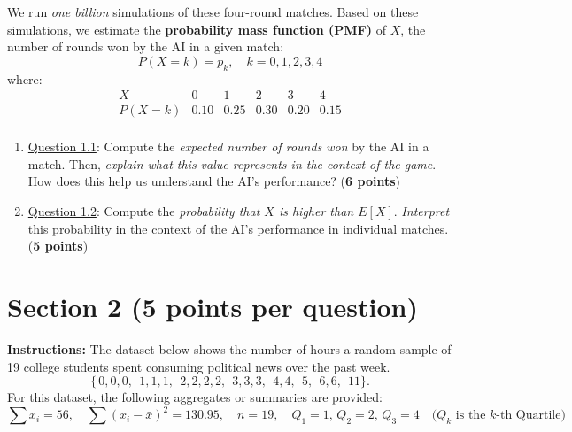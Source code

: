 \documentclass{article}
\newcommand{\blankbox}[2][3cm]{%
    \vspace{-0.5em}
    \begin{figure}[H]
        \makebox[\linewidth]{%
            \begin{tcolorbox}[
                colback=white, 
                colframe=black, 
                width=#2, %
                height=#1,
                boxrule=0.2mm
            ]
            \end{tcolorbox}
        }
    \end{figure}
    \vspace{-2em}
}
\begin{document}
We run \emph{one billion} simulations of these four-round matches. Based on these simulations, we estimate the \textbf{probability mass function (PMF)} of $X$, the number of rounds won by the AI in a given match:
\[
P(X = k) = p_k, \quad k = 0,1,2,3,4
\]
where:
\[
\begin{array}{c|c|c|c|c|c}
X & 0 & 1 & 2 & 3 & 4 \\\hline
P(X = k) & 0.10 & 0.25 & 0.30 & 0.20 & 0.15 \\
\end{array}
\]

\begin{enumerate}
    \item \underline{Question 1.1}: Compute the \emph{expected number of rounds won} by the AI in a match. Then, \emph{explain what this value represents in the context of the game}. How does this help us understand the AI's performance?  (\textbf{6 points})
        \blankbox[6cm]{1.06\textwidth}  
    \item \underline{Question 1.2}: Compute the \emph{probability that $X$ is higher than $E[X]$}. \emph{Interpret} this probability in the context of the AI's performance in individual matches. (\textbf{5 points})
        \blankbox[5cm]{1.06\textwidth}

        
\end{enumerate}

\newpage
\section*{Section 2 (5 points per question)}

\noindent\textbf{Instructions:}  
The dataset below shows the number of hours a random sample of 19 college students spent consuming political news over the past week.
\[
\{\,0,0,0,\;\,1,1,1,\;\,2,2,2,2,\;\,3,3,3,\;\,4,4,\;\,5,\;\,6,6,\;\,11\}.
\]
\noindent 
For this dataset, the following aggregates or summaries are provided:
\[
\sum x_i = 56, \quad \sum (x_i - \bar{x})^2 = 130.95, \quad n = 19,  \quad  Q_1 = 1,\, Q_2 = 2, \, Q_3 = 4 \quad \text{($Q_k$ is the $k$-th Quartile)}
\]

\begin{comment}
{
    "sum_x": 56,
    "sum_x_squared": 296,
    "sum_x_minus_mean_squared": 130.95,  # Rounded from 130.9473684210526
    "n": 19,
    "Q1": 1.0,
    "Q2": 2.0,
    "Q3": 4.0
}
\end{comment}
\end{document}
